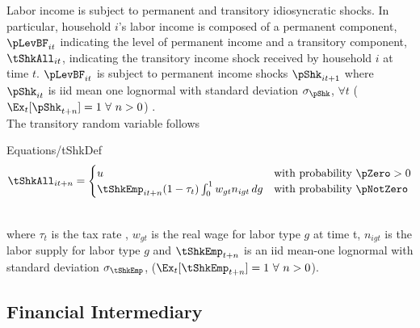 \documentclass[titlepage]{\econtex}\providecommand{\texname}{BufferStockTheory}
\providecommand{\EqDir}{Equations}
\begin{document}
Labor income is subject to permanent and transitory idiosyncratic shocks. In particular, household $i$'s labor income is composed of a permanent component, $\pLevBF_{it} $ indicating the level of permanent income and a transitory component, $\tShkAll_{it} $, indicating the transitory income shock received by household $i$ at time $t$. $\pLevBF_{it} $ is subject to permanent income shocks $\pShk_{it+1}$ where $\pShk_{it}$ is iid mean one lognormal with standard deviation $\sigma_\pShk$, $\forall t$  
($\Ex_{t}[{\pShk}_{t+n}]=1~\forall~n>0$) . \\



The transitory random variable follows   \\
\begin{verbatimwrite}{\EqDir/tShkDef}
\begin{equation}
\tShkAll _{it+n}=
\begin{cases}
 u \phantom{_{t+1}/\pNotZero} & \text{with probability $\pZero>0$} \\
 \tShkEmp_{it+n} (1-\tau_{t})\int_{0}^{1} w_{gt}n_{igt} \, dg      & \text{with probability $\pNotZero  $} 
\end{cases} \label{eq:tShkDef}
\end{equation}
\end{verbatimwrite}
\\
where $\tau_{t}$ is the tax rate , $w_{gt}$ is the real wage for labor type $g$ at time t, $ n_{igt}$ is the labor supply for labor type $g$ and $\tShkEmp_{t+n}$ is an iid mean-one lognormal with standard deviation $\sigma_{\tShkEmp}$,
($\Ex_{t}[{\tShkEmp}_{t+n}]=1~\forall~n>0$). \\ 




\begin{comment}
Combining the transition equations, the recursive nature of
the problem allows us to rewrite it more compactly in Bellman equation form,
\begin{eqnarray*}
\VFunc_{t}(\mLevBF_{t},\pLevBF_{t}) & = & \max_{\cLevBF_{t}}~\left\{\util(\cLevBF_{t})+\DiscFac \Ex_{t}\left[ \VFunc_{t+1}((\mLevBF_{t}-\cLevBF_{t})\Rfree+ \pLevBF_{t+1}\tShkAll_{t+1},\pLevBF_{t} \PGro  \pShk_{t+1})\right]\right\}
.
\end{eqnarray*}
\end{comment}

\hypertarget{Financial Intermediary}{}
\subsection{Financial Intermediary}
\end{document}
